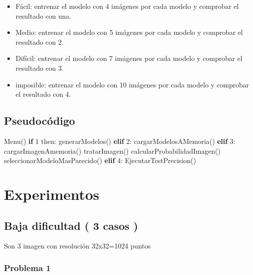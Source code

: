 \documentclass[
  spanish,
]{article}
\newenvironment{Shaded}{}{}
\newcommand{\ControlFlowTok}[1]{\textcolor[rgb]{0.00,0.44,0.13}{\textbf{#1}}}
\newcommand{\DecValTok}[1]{\textcolor[rgb]{0.25,0.63,0.44}{#1}}
\newcommand{\NormalTok}[1]{#1}
\providecommand{\tightlist}{%
  \setlength{\itemsep}{0pt}\setlength{\parskip}{0pt}}
\begin{document}
\begin{itemize}
\tightlist
\item
  Fácil: entrenar el modelo con 4 imágenes por cada modelo y comprobar
  el resultado con una.
\item
  Medio: entrenar el modelo con 5 imágenes por cada modelo y comprobar
  el resultado con 2.
\item
  Difícil: entrenar el modelo con 7 imágenes por cada modelo y comprobar
  el resultado con 3.
\item
  imposible: entrenar el modelo con 10 imágenes por cada modelo y
  comprobar el resultado con 4.
\end{itemize}

\hypertarget{pseudocuxf3digo}{%
\subsection{Pseudocódigo}\label{pseudocuxf3digo}}

\begin{Shaded}
\begin{Highlighting}[]
\NormalTok{Menu()}
    \ControlFlowTok{if} \DecValTok{1}\NormalTok{ then:}
\NormalTok{        generarModelos()}
    \ControlFlowTok{elif} \DecValTok{2}\NormalTok{:}
\NormalTok{        cargarModelosAMemoria()}
    \ControlFlowTok{elif} \DecValTok{3}\NormalTok{:}
\NormalTok{        cargarImagenAmemoria()}
\NormalTok{        tratarImagen()}
\NormalTok{        calcularProbabilidadImagen()}
\NormalTok{        seleccionarModeloMasParecido()}
   \ControlFlowTok{elif} \DecValTok{4}\NormalTok{:}
\NormalTok{        EjecutarTestPrecision()}
\end{Highlighting}
\end{Shaded}

\hypertarget{experimentos}{%
\section{Experimentos}\label{experimentos}}

\hypertarget{baja-dificultad-3-casos}{%
\subsection{Baja dificultad ( 3 casos )}\label{baja-dificultad-3-casos}}

Son 3 imagen con resolución 32x32=1024 puntos

\hypertarget{problema-1}{%
\subsubsection{Problema 1}\label{problema-1}}
\end{document}
